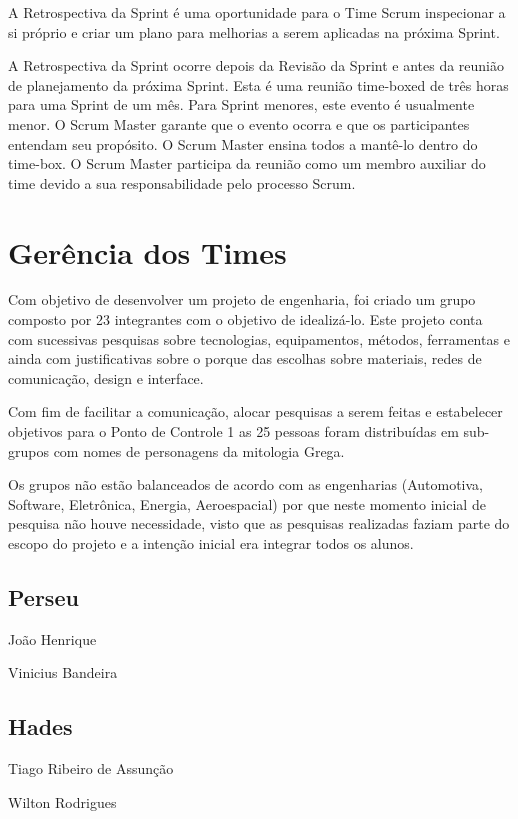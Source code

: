 A Retrospectiva da Sprint é uma oportunidade para o Time Scrum inspecionar a si próprio e
criar um plano para melhorias a serem aplicadas na próxima Sprint.

A Retrospectiva da Sprint ocorre depois da Revisão da Sprint e antes da reunião de
planejamento da próxima Sprint. Esta é uma reunião time-boxed de três horas para uma Sprint
de um mês. Para Sprint menores, este evento é usualmente menor. O Scrum Master garante
que o evento ocorra e que os participantes entendam seu propósito. O Scrum Master ensina
todos a mantê-lo dentro do time-box. O Scrum Master participa da reunião como um membro
auxiliar do time devido a sua responsabilidade pelo processo Scrum.


\section{Gerência dos Times}
\label{sec:Time Scrum}


	Com objetivo de desenvolver um projeto de engenharia, foi criado um grupo composto por 23 integrantes com
  o objetivo de idealizá-lo. Este projeto conta com sucessivas pesquisas sobre tecnologias, equipamentos,
  métodos, ferramentas e ainda com justificativas sobre o porque das escolhas sobre materiais, redes de
  comunicação, design e interface.

	Com fim de facilitar a comunicação, alocar pesquisas a serem feitas e estabelecer objetivos para o Ponto
  de Controle 1 as 25 pessoas foram distribuídas em sub-grupos com nomes de personagens da mitologia Grega.

	Os grupos não estão balanceados de acordo com as engenharias (Automotiva, Software, Eletrônica, Energia,
  Aeroespacial) por que neste momento inicial de pesquisa não houve necessidade, visto que as pesquisas
  realizadas faziam parte do escopo do projeto e a intenção inicial era integrar todos os alunos.

\subsection{Perseu}
\label{sub:Perseu}
João Henrique

Vinicius Bandeira

\subsection{Hades}
\label{sub:Hades}
Tiago Ribeiro de Assunção

Wilton Rodrigues

